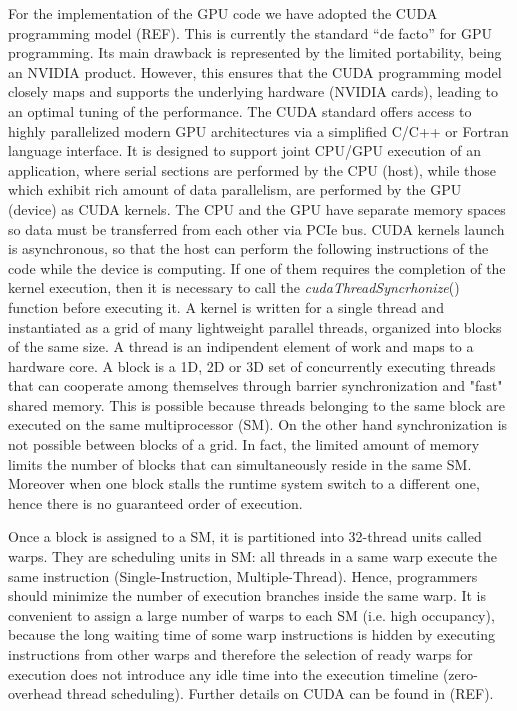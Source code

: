 \documentclass[11pt]{article}
\begin{document}
For the implementation of the GPU code we have adopted the CUDA programming model (REF). This is currently the standard ``de facto'' for GPU programming.
Its main drawback is represented by the limited portability, being an NVIDIA product. However,
this ensures that the CUDA programming model closely maps and supports the underlying
hardware (NVIDIA cards), leading to an optimal tuning of the performance.
The CUDA standard offers access to highly parallelized modern GPU architectures via a simplified C/C++ or Fortran language interface. It is designed to support joint CPU/GPU execution of an application, where serial sections are performed by the CPU (host), while those which exhibit rich amount of data parallelism, are performed by the GPU (device) as CUDA kernels. The CPU and the GPU have separate memory spaces so data must be transferred from each other via PCIe bus. CUDA kernels launch is asynchronous, so that the host can
 perform the following instructions of the code while the device is computing. If one of them requires the completion 
of the kernel execution, then it is necessary to call the \textit{cudaThreadSyncrhonize}() function before executing it.
A kernel is written for a single thread and instantiated as a grid of many lightweight parallel threads, organized into blocks of the same size. A thread is an indipendent element of work and maps to a hardware core. A block is a 1D, 2D or 3D set of concurrently executing threads that can cooperate among themselves through barrier synchronization and "fast" shared memory. 
This is possible because threads belonging to the same block are executed on the same multiprocessor (SM). On the other hand
 synchronization is not possible between blocks of a grid. In fact, the limited amount of memory limits the number of 
blocks that can simultaneously reside in the same SM. Moreover when one block stalls the runtime system switch to 
a different one, hence there is no guaranteed order of execution.

Once a block is assigned to a SM, it is partitioned into 32-thread units called warps. They are scheduling units in SM:
all threads in a same warp execute the same instruction (Single-Instruction, Multiple-Thread). Hence, programmers should minimize the number of execution branches inside the same warp. It is convenient to assign a large number of warps to each SM (i.e. high occupancy), because the long waiting time of some warp instructions is hidden by executing instructions from other warps  and therefore the selection of ready warps for execution does not introduce any idle time into the execution timeline (zero-overhead thread scheduling). Further details on CUDA can be found in (REF).
\end{document}
